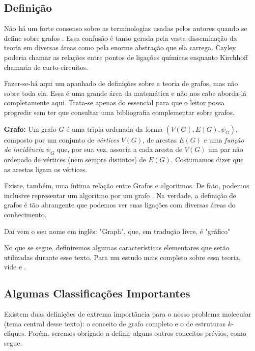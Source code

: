 \documentclass[a4paper,12pt]{article}
\begin{document}
\subsection{Definição}

Não há um forte consenso sobre as terminologias usadas pelos autores quando se define sobre grafos \cite{graphTheoryFHarary}. Essa confusão é tanto gerada pela vasta disseminação da teoria em diversas áreas como pela enorme abstração que ela carrega. Cayley poderia chamar as relações entre pontos de ligações químicas enquanto Kirchhoff chamaria de curto-circuitos.

Fazer-se-há aqui um apanhado de definições sobre a teoria de grafos, mas não sobre toda ela. Essa é uma grande área da matemática e não nos cabe aborda-lá completamente aqui. Trata-se apenas do essencial para que o leitor possa progredir sem ter que consultar uma bibliografia complementar sobre grafos.

\begin{center}
	\begin{minipage}{0.9 \linewidth}
		\textbf{Grafo:} Um grafo $G$ é uma tripla ordenada da forma $(V(G),E(G), \psi_{G})$, composto por um conjunto de \textit{vértices} $V(G)$, de arestas $E(G)$ e uma \textit{função de incidência} $\psi_{G}$ que, por sua vez, associa a cada aresta de $V(G)$ um par não ordenado de vértices (nem sempre distintos) de $E(G)$. Costumamos dizer que as arestas ligam os vértices.
	\end{minipage}
\end{center}

Existe, também, uma íntima relação entre Grafos e algoritmos. De fato, podemos inclusive representar um algoritmo por um grafo \cite{grafos0}. Na verdade, a definição de grafos é tão abrangente que podemos ver suas ligações com diversas áreas do conhecimento. 

Daí vem o seu nome em inglês: "Graph", que, em tradução livre, é "gráfico"

No que se segue, definiremos algumas características elementares que serão utilizadas durante esse texto. Para um estudo mais completo sobre essa teoria, vide \cite{grafos1} e \cite{grafosPremioElon}.

\subsection{Algumas Classificações Importantes}

Existem duas definições de extrema importância para o nosso problema molecular (tema central desse texto): o conceito de grafo completo e o de estruturas $k$-cliques. Porém, seremos obrigado a definir alguns outros conceitos prévios, como segue. 
\end{document}
